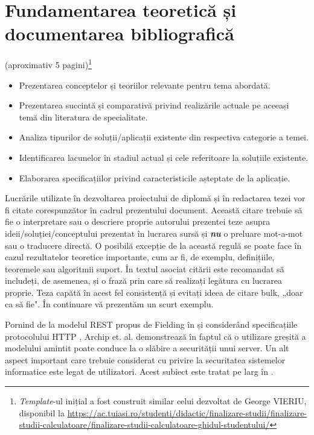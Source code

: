 \chapter{Fundamentarea teoretică și documentarea bibliografică}
\label{cap:cap2}

(aproximativ 5 pagini)\footnote{\textit{Template}-ul inițial a fost construit similar celui dezvoltat de George VIERIU, disponibil la \url{https://ac.tuiasi.ro/studenti/didactic/finalizare-studii/finalizare-studii-calculatoare/finalizare-studii-calculatoare-ghidul-studentului/}}

\begin{itemize}
    \item Prezentarea conceptelor și teoriilor relevante pentru tema abordată.
    \item Prezentarea succintă și comparativă privind realizările actuale pe aceeași temă din literatura de specialitate.
    \item Analiza tipurilor de soluții/aplicații existente din respectiva categorie a temei.
    \item Identificarea lacunelor în stadiul actual și cele referitoare la soluțiile existente.
    \item Elaborarea specificațiilor privind caracteristicile așteptate de la aplicație.
\end{itemize}

Lucrările utilizate în dezvoltarea proiectului de diplomă și în redactarea tezei vor fi citate corespunzător în cadrul prezentului document. Această citare trebuie să fie o interpretare sau o descriere proprie autorului prezentei teze asupra ideii/soluției/conceptului prezentat în lucrarea sursă și \textbf{\textit{nu}} o preluare mot-a-mot sau o traducere directă. O posibilă excepție de la această regulă se poate face în cazul rezultatelor teoretice importante, cum ar fi, de exemplu, definițiile, teoremele sau algoritmii suport. În textul asociat citării este recomandat să includeți, de asemenea, și o frază prin care să realizați legătura cu lucrarea proprie. Teza capătă în acest fel consistență și evitați ideea de citare bulk, „doar ca să fie". În continuare vă prezentăm un scurt exemplu.


Pornind de la modelul REST propus de Fielding în \cite{thesis:fielding:2000} și considerând specificațiile protocolului HTTP \cite{misc:web:rfc7231}, Archip et. al. demonstrează în \cite{inproc:archip:restful:2018} faptul că o utilizare greșită a modelului amintit poate conduce la o slăbire a securității unui server. Un alt aspect important care trebuie considerat cu privire la securitatea sistemelor informatice este legat de utilizatori. Acest subiect este tratat pe larg în \cite{incollection:ARASEC2020}.

